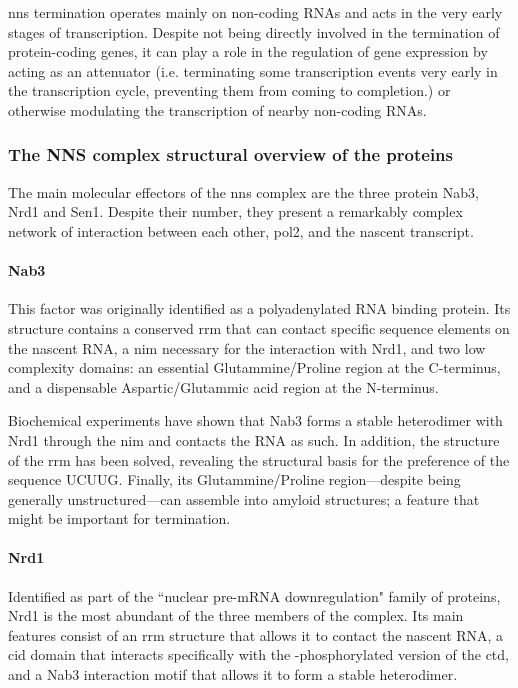 \gls{nns} termination operates mainly on non-coding RNAs and acts in the very early stages of transcription.
Despite not being directly involved in the termination of protein-coding genes, it can play a role in the regulation of gene expression by acting as an attenuator (i.e. terminating some transcription events very early in the transcription cycle, preventing them from coming to completion.) or otherwise modulating the transcription of nearby non-coding RNAs.


\subsubsection{The NNS complex structural overview of the proteins}

The main molecular effectors of the \gls{nns} complex are the three protein Nab3, Nrd1 and Sen1.
Despite their number, they present a remarkably complex network of interaction between each other, \gls{pol2}, and the nascent transcript.

\paragraph{Nab3}

This factor was originally identified as a polyadenylated RNA binding protein.
Its structure contains a conserved \gls{rrm} that can contact specific sequence elements on the nascent RNA, a \gls{nim} necessary for the interaction with Nrd1, and two low complexity domains: an essential Glutammine/Proline region at the C-terminus, and a dispensable Aspartic/Glutammic acid region at the N-terminus. 

Biochemical experiments have shown that Nab3 forms a stable heterodimer with Nrd1 through the \gls{nim} and contacts the RNA as such. 
In addition, the structure of the \gls{rrm} has been solved, revealing the structural basis for the preference of the sequence UCUUG.
Finally, its Glutammine/Proline region---despite being generally unstructured---can assemble into amyloid structures; a feature that might be important for termination.


\paragraph{Nrd1}

Identified as part of the ``nuclear pre-mRNA downregulation" family of proteins, Nrd1 is the most abundant of the three members of the complex.
Its main features consist of an \gls{rrm} structure that allows it to contact the nascent RNA, a \gls{cid} domain that interacts specifically with the \serf{}-phosphorylated version of the \gls{ctd}, and a Nab3 interaction motif that allows it to form a stable heterodimer.

